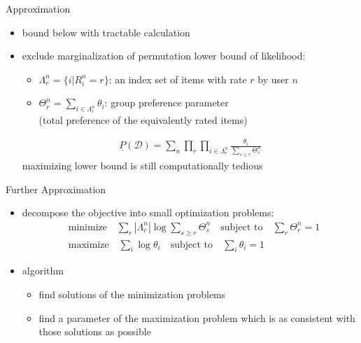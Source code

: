 \documentclass[fleqn,aspectratio=1610]{beamer}
\begin{document}
\begin{frame}[label={sec:orgb42c534}]{Approximation}
\begin{itemize}
\item bound below with tractable calculation
\item exclude marginalization of permutation
lower bound of likelihood:
\begin{itemize}
\item \(\Lambda_r^n=\{i|R_i^n=r\}\): an index set of items with rate \(r\)
by user \(n\)
\item \(\Theta_r^n=\sum_{i\in \Lambda_r^n}\theta_i\): group preference
parameter\\[0pt]
(total preference of the equivalently rated items)
\end{itemize}
\begin{align}
  \underline{P}(\mathcal{D})
  =\sum_{n}\prod_{r}\prod_{i\in \Lambda_r^n}
  \frac{\theta_i}{\sum_{s\le r}\Theta_s^n}
\end{align}
\alert{maximizing lower bound is still computationally tedious}
\end{itemize}
\end{frame}

\begin{frame}[label={sec:org9fe243d}]{Further Approximation}
\begin{itemize}
\item decompose the objective into small optimization problems: 
\begin{align}
  &\text{minimize}\quad\sum_r|\Lambda_r^n|\log\sum_{s\ge r}\Theta_s^n
    \quad\text{subject to}\quad\sum_r\Theta_r^n=1\\
  &\text{maximize}\quad\sum_i\log\theta_i
    \quad\text{subject to}\quad\sum_i\theta_i=1
\end{align}
\item algorithm
\begin{itemize}
\item find solutions of the minimization problems
\item find a parameter of the maximization problem 
which is as consistent with those solutions as possible
\end{itemize}
\end{itemize}
\end{frame}
\end{document}
